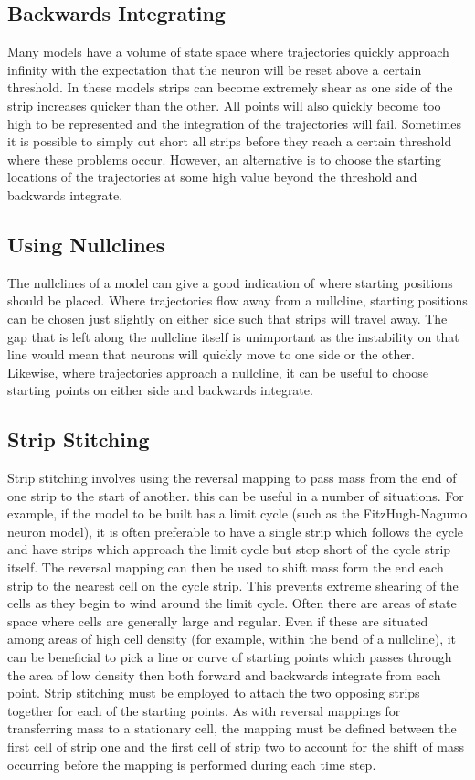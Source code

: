 \documentclass[utf8]{frontiers_suppmat} %
\begin{document}
\subsection{Backwards Integrating}
Many models have a volume of state space where trajectories quickly approach infinity with the expectation that the neuron will be reset above a certain threshold. In these models strips can become extremely shear as one side of the strip increases quicker than the other. All points will also quickly become too high to be represented and the integration of the trajectories will fail. Sometimes it is possible to simply cut short all strips before they reach a certain threshold where these problems occur. However, an alternative is to choose the starting locations of the trajectories at some high value beyond the threshold and backwards integrate.

\subsection{Using Nullclines}
The nullclines of a model can give a good indication of where starting positions should be placed. Where trajectories flow away from a nullcline, starting positions can be chosen just slightly on either side such that strips will travel away. The gap that is left along the nullcline itself is unimportant as the instability on that line would mean that neurons will quickly move to one side or the other. Likewise, where trajectories approach a nullcline, it can be useful to choose starting points on either side and backwards integrate.

\subsection{Strip Stitching}
Strip stitching involves using the reversal mapping to pass mass from the end of one strip to the start of another. this can be useful in a number of situations. For example, if the model to be built has a limit cycle (such as the FitzHugh-Nagumo neuron model), it is often preferable to have a single strip which follows the cycle and have strips which approach the limit cycle but stop short of the cycle strip itself. The reversal mapping can then be used to shift mass form the end each strip to the nearest cell on the cycle strip. This prevents extreme shearing of the cells as they begin to wind around the limit cycle. 
Often there are areas of state space where cells are generally large and regular. Even if these are situated among areas of high cell density (for example, within the bend of a nullcline), it can be beneficial to pick a line or curve of starting points which passes through the area of low density then both forward and backwards integrate from each point. Strip stitching must be employed to attach the two opposing strips together for each of the starting points. 
As with reversal mappings for transferring mass to a stationary cell, the mapping must be defined between the first cell of strip one and the first cell of strip two to account for the shift of mass occurring before the mapping is performed during each time step.
\end{document}
